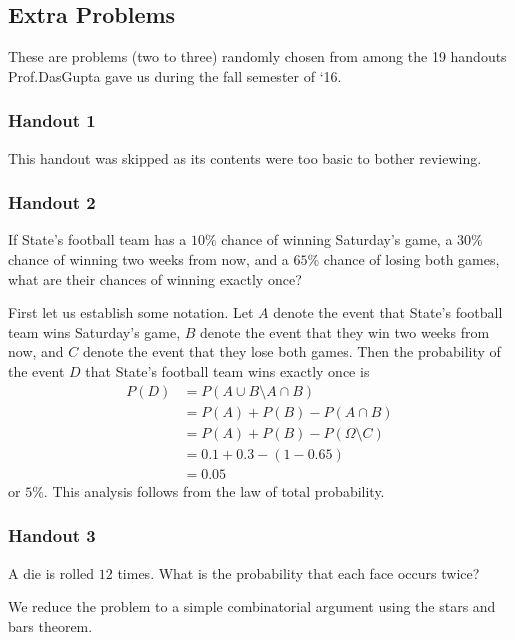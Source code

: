 \subsection{Extra Problems}
These are problems (two to three) randomly chosen from among the 19
handouts Prof.\@ DasGupta gave us during the fall semester of `16.
\subsubsection{Handout 1}
This handout was skipped as its contents were too basic to bother
reviewing.
\subsubsection{Handout 2}
\begin{problem}[Handout 2, \# 3]
  If State's football team has a \(10\%\) chance of winning Saturday's
  game, a \(30\%\) chance of winning two weeks from now, and a \(65\%\)
  chance of losing both games, what are their chances of winning exactly
  once?
\end{problem}
\begin{solution*}
  First let us establish some notation. Let \(A\) denote the event that
  State's football team wins Saturday's game, \(B\) denote the event that
  they win two weeks from now, and \(C\) denote the event that they lose
  both games. Then the probability of the event \(D\) that State's football
  team wins exactly once is
  \begin{align*}
    P(D)
    &=P(A\cup B\setminus A\cap B)\\
    &=P(A)+P(B)-P(A\cap B)\\
    &=P(A)+P(B)-P(\Omega\setminus C)\\
    &=0.1+0.3-(1-0.65)\\
    &=0.05
  \end{align*}
  or \(5\%\). This analysis follows from the law of total probability.
\end{solution*}

\subsubsection{Handout 3}
\begin{problem}[Handout 3, \# 4]
  A die is rolled \(12\) times. What is the probability that each face
  occurs twice?
\end{problem}
\begin{solution*}
  We reduce the problem to a simple combinatorial argument using the stars
  and bars theorem.
\end{solution*}


